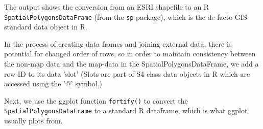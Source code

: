 \documentclass[titlepage]{book}\usepackage{knitr}
\begin{document}
\begin{knitrout}
\color{fgcolor}\begin{kframe}
\begin{alltt}

 \hlkwb{<-} 
 \hlkwb{<-} 
 \hlkwb{<-} \hlstd{(} 
\end{alltt}
\end{kframe}
\end{knitrout}
The output shows the conversion from an ESRI shapefile to an R \texttt{SpatialPolygonsDataFrame} (from the \texttt{sp} package), which is the de facto GIS standard data object in R. 

In the process of creating data frames and joining external data, there is potential for changed order of rows, so in order to maintain consistency between the non-map data and the map-data in the SpatialPolygonsDataFrame, we add a row ID to its data 'slot' (Slots are part of S4 class data objects in R which are accessed using the '@' symbol.)

Next, we use the ggplot function \texttt{fortify()} to convert the \texttt{SpatialPolygonsDataFrame} to a standard R dataframe, which is what ggplot usually plots from. 
\end{document}
